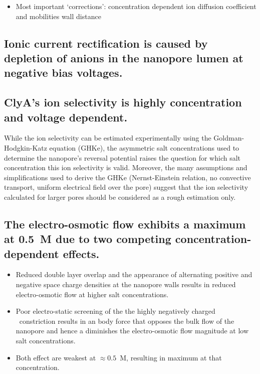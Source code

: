 \documentclass[journal=ancac3,manuscript=article,etalmode=truncate,maxauthors=0,layout=twocolumn]{achemso}
\begin{document}
\begin{itemize}
  \item Most important `corrections':
  \subitem concentration dependent ion diffusion coefficient and mobilities
  \subitem wall distance
\end{itemize}

\subsection{Ionic current rectification is caused by depletion of anions in the nanopore lumen at negative
bias voltages.}

\subsection{ClyA's ion selectivity is highly concentration and voltage dependent.}
While the ion selectivity can be estimated experimentally using the Goldman-Hodgkin-Katz
equation (GHKe),\cite{Franceschini-2016,Huang-2017} the asymmetric salt concentrations used to determine the
nanopore's reversal potential raises the question for which salt concentration this ion selectivity is valid.
Moreover, the many assumptions and simplifications used to derive the GHKe (Nernst-Einstein relation, no
convective transport, uniform electrical field over the pore) suggest that the ion selectivity calculated for
larger pores should be considered as a rough estimation only.

\subsection{The electro-osmotic flow exhibits a maximum at 0.5~M due to two competing concentration-dependent
effects.}

\begin{itemize}
  \item Reduced double layer overlap and the appearance of alternating positive and negative space charge
  densities at the nanopore walls results in reduced electro-osmotic flow at higher salt concentrations.
  \item Poor electro-static screening of the the highly negatively charged \trans\ constriction
  results in an body force that opposes the bulk flow of the nanopore and hence a diminishes the
  electro-osmotic flow magnitude at low salt concentrations.
  \item Both effect are weakest at $\approx0.5$~M, resulting in maximum at that concentration.
\end{itemize}
\end{document}
